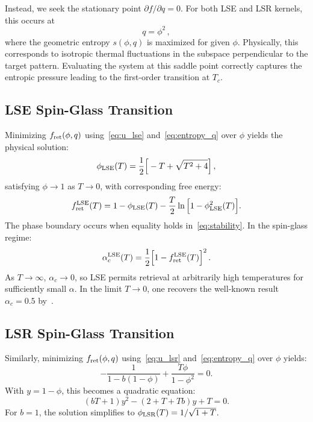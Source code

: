 \documentclass{article}
\theoremstyle{plain}
\theoremstyle{definition}
\theoremstyle{remark}
\begin{document}
Instead, we seek the stationary point $\partial f / \partial q = 0$. For both LSE and LSR kernels, this occurs at 
\begin{equation}
    q = \phi^2\,,
    \label{eq:q_constraint}
\end{equation}
where the geometric entropy $s(\phi, q)$ is maximized for given $\phi$. Physically, this corresponds to isotropic thermal fluctuations in the subspace perpendicular to the target pattern. Evaluating the system at this saddle point correctly captures the entropic pressure leading to the first-order transition at $T_c$.

\subsection{LSE Spin-Glass Transition}

Minimizing $f_{\rm ret}(\phi, q)$ using~\eqref{eq:u_lse} and~\eqref{eq:entropy_q} over $\phi$ yields the physical solution:
\begin{equation}
    \phi_{\rm LSE}(T) = \frac{1}{2} \Big[-T + \sqrt{T^2 + 4}\Big]\,,
    \label{eq:phi_lse}
\end{equation}
satisfying $\phi \to 1$ as $T \to 0$, with corresponding free energy:
\begin{equation}
    f_{\rm ret}^{\rm LSE}(T) = 1 - \phi_{\rm LSE}(T) - \frac{T}{2}\ln\Big[1 - \phi^2_{\rm LSE}(T)\Big].
    \label{eq:f_lse}
\end{equation}
The phase boundary occurs when equality holds in~\eqref{eq:stability}. In the spin-glass regime:
\begin{equation}
    \alpha_c^{\rm LSE}(T) = \frac{1}{2} \Big[1 - f_{\rm ret}^{\rm LSE}(T) \Big]^2\,.
    \label{eq:alpha_lse}
\end{equation}
As $T \to \infty$, $\alpha_c \to 0$, so LSE permits retrieval at arbitrarily high temperatures for sufficiently small $\alpha$. In the limit $T \to 0$, one recovers the well-known result $\alpha_c = 0.5$ by~\citet{ramsauer2021hopfield}.


\subsection{LSR Spin-Glass Transition}

Similarly, minimizing $f_{\rm ret}(\phi, q)$ using~\eqref{eq:u_lsr} and~\eqref{eq:entropy_q} over $\phi$ yields:
\begin{equation}
    -\frac{1}{1 - b(1-\phi)} + \frac{T\phi}{1-\phi^2} = 0.
\end{equation}
With $y = 1 - \phi$, this becomes a quadratic equation:
\begin{equation}
    (bT + 1)y^2 - (2 + T + Tb)y + T = 0.
    \label{eq:lsr_quadratic}
\end{equation}
For $b = 1$, the solution simplifies to $\phi_{\rm LSR}(T) = 1/\sqrt{1+T}$.
\end{document}
